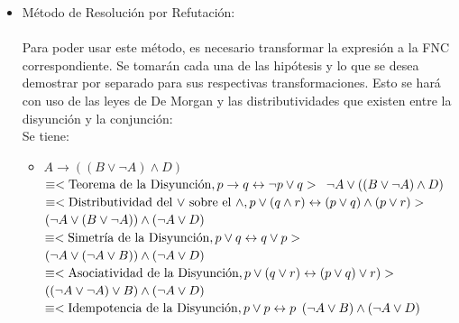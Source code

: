 \documentclass{article}
\begin{document}
\begin{itemize}
\begin{itemize}
	
	\item M\'etodo de Resoluci\'on por Refutaci\'on:
	
		\paragraph{}
		Para poder usar este m\'etodo, es necesario transformar la expresi\'on a la FNC correspondiente. Se tomar\'an cada una de las hip\'otesis y lo que se desea demostrar por separado para sus respectivas transformaciones. Esto se har\'a con uso de las leyes de De Morgan y las distributividades que existen entre la disyunci\'on y la conjunci\'on: \\
		
		Se tiene:
		
		\begin{itemize}

		\item $ A \rightarrow (( B \lor \neg A ) \land D)$ \\
				$\equiv < \text{Teorema de la Disyunci\'on},  
					p \rightarrow q \leftrightarrow \neg p \lor q > \\$
				$\neg A \lor ((B \lor \neg A) \land D)\\$		
				$\equiv <\text{Distributividad del $\lor$ sobre el $\land$}, 		
					p \lor (q \land r) \leftrightarrow (p \lor q) \land (p \lor r)>\\$
				$ (\neg A \lor (B \lor \neg A)) \land (\neg A \lor D) \\$
				$\equiv < \text{Simetr\'ia de la Disyunci\'on}, 
					p \lor q \leftrightarrow q \lor p >\\$
				$(\neg A \lor (\neg A \lor B)) \land (\neg A \lor D) \\$
				$\equiv <\text{Asociatividad de la Disyunci\'on}, 
					p \lor (q \lor r) \leftrightarrow (p \lor q) \lor r) >\\$
				$((\neg A \lor \neg A) \lor B) \land (\neg A \lor D) \\$
				$\equiv <\text{Idempotencia de la Disyunci\'on}, 
					p \lor p \leftrightarrow p\\$
				$(\neg A \lor B) \land (\neg A \lor D)\\$
								

\end{itemize}
\end{itemize}
\end{itemize}
\end{document}
